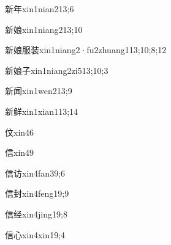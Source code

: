\begin{verbete}{新年}{xin1nian2}{13;6}
\end{verbete}

\begin{verbete}{新娘}{xin1niang2}{13;10}
\end{verbete}

\begin{verbete}{新娘服装}{xin1niang2·fu2zhuang1}{13;10;8;12}
\end{verbete}

\begin{verbete}{新娘子}{xin1niang2zi5}{13;10;3}
\end{verbete}

\begin{verbete}{新闻}{xin1wen2}{13;9}
\end{verbete}

\begin{verbete}{新鲜}{xin1xian1}{13;14}
\end{verbete}

\begin{verbete}{伩}{xin4}{6}
\end{verbete}

\begin{verbete}{信}{xin4}{9}
\end{verbete}

\begin{verbete}{信访}{xin4fan3}{9;6}
\end{verbete}

\begin{verbete}{信封}{xin4feng1}{9;9}
\end{verbete}

\begin{verbete}{信经}{xin4jing1}{9;8}
\end{verbete}

\begin{verbete}{信心}{xin4xin1}{9;4}
\end{verbete}

